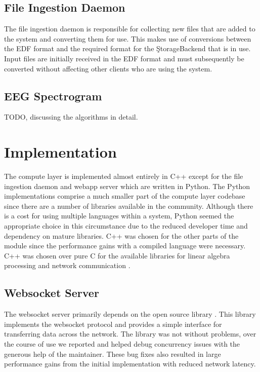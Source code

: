 \subsection{File Ingestion Daemon}

The file ingestion daemon is responsible for collecting new files that are
added to the system and converting them for use. This makes use of conversions
between the EDF format and the required format for the \c{StorageBackend} that
is in use. Input files are initially received in the EDF format and must
subsequently be converted without affecting other clients who are using the
system.

\subsection{EEG Spectrogram}\label{compute-ch:design-spectrogram}

TODO, discussing the algorithms in detail.

\section{Implementation}

The compute layer is implemented almost entirely in C++ except for the file
ingestion daemon and webapp server which are written in Python. The Python
implementations comprise a much smaller part of the compute layer codebase
since there are a number of libraries available in the community. Although
there is a cost for using multiple languages within a system, Python seemed the
appropriate choice in this circumstance due to the reduced developer time and
dependency on mature libraries. C++ was chosen for the other parts of the
module since the performance gains with a compiled language were necessary. C++
was chosen over pure C for the available libraries for linear algebra
processing \cite{arma} and network communication \cite{websocket-server}.

\subsection{Websocket Server}\label{compute-ch:implementation-ws-server}

The websocket server primarily depends on the open source library
\cite{websocket-server}. This library implements the websocket protocol and
provides a simple interface for transferring data across the network. The
library was not without problems, over the course of use we reported and helped
debug concurrency issues with the generous help of the maintainer.  These bug
fixes also resulted in large performance gains from the initial implementation
with reduced network latency. \\


